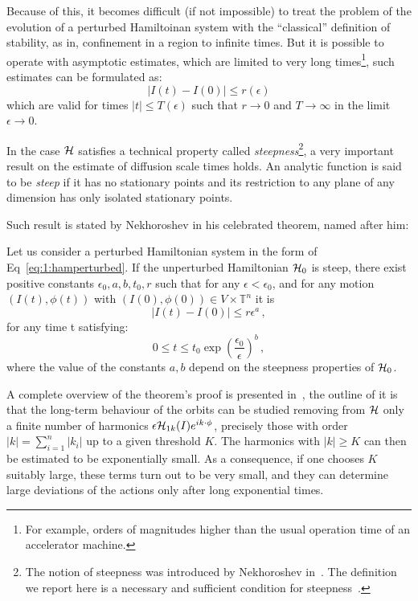 Because of this, it becomes difficult (if not impossible) to treat the problem of the evolution of a perturbed Hamiltoinan system with the ``classical'' definition of stability, as in, confinement in a region to infinite times. But it is possible to operate with asymptotic estimates, which are limited to very long times\footnote{For example, orders of magnitudes higher than the usual operation time of an accelerator machine.}, such estimates can be formulated as:
\begin{equation}
    |I(t)-I(0)| \leq r(\epsilon)
\end{equation}
which are valid for times $|t| \leq T(\epsilon)$ such that $r \rightarrow 0$ and $T \rightarrow \infty$ in the limit $\epsilon \rightarrow 0$. 

In the case $\mathcal{H}$ satisfies a technical property called \textit{steepness}\footnote{The notion of steepness was introduced by Nekhoroshev in~\cite{}. The definition we report here is a necessary and sufficient condition for steepness~\cite{}.}, a very important result on the estimate of diffusion scale times holds. An analytic function is said to be \textit{steep} if it has no stationary points and its restriction to any plane of any dimension has only isolated stationary points.

Such result is stated by Nekhoroshev in his celebrated theorem, named after him:
\begin{theorem}
    Let us consider a perturbed Hamiltonian system in the form of Eq~\eqref{eq:1:hamperturbed}. If the unperturbed Hamiltonian $\mathcal{H}_0$ is steep, there exist positive constants $\epsilon_0, a, b, t_0, r$ such that for any $\epsilon<\epsilon_0$, and for any motion $(I(t), \phi(t))$ with $(I(0), \phi(0)) \in V \times \mathbb{T}^n$ it is
    \begin{equation}
        |I(t)-I(0)| \leq r \epsilon^a \,,
    \end{equation}
    for any time t satisfying:
    \begin{equation}
        0 \leq t \leq t_0 \exp \left(\frac{\epsilon_0}{\epsilon}\right)^b \,,  
    \end{equation}
    where the value of the constants $a, b$ depend on the steepness properties of $\mathcal{H}_0$.
\end{theorem}

A complete overview of the theorem's proof is presented in~\cite{}, the outline of it is that the long-term behaviour of the orbits can be studied removing from $\mathcal{H}$ only a finite number of harmonics $\epsilon \mathcal{H}_{1k}(I) e^{i k \cdot \phi}$, precisely those with order $|k|=\sum_{i=1}^n\left|k_i\right|$ up to a given threshold $K$. The harmonics with $|k| \geq K$ can then be estimated to be exponentially small. As a consequence, if one chooses $K$ suitably large, these terms turn out to be very small, and they can determine large deviations of the actions only after long exponential times.

